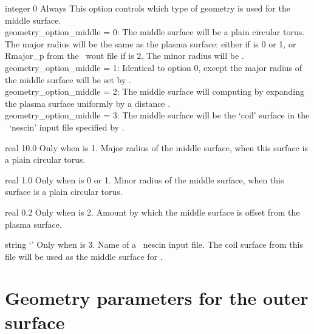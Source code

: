 {integer}
{0}
{Always}
{This option controls which type of geometry is used for the middle surface.\\

{\ttfamily geometry\_option\_middle} = 0: The middle surface will be a plain circular torus. The major radius will be the 
same as the plasma surface: either  if  is 0 or 1, or {\ttfamily Rmajor\_p} from the \vmec~{\ttfamily wout} file
if   is 2.
     The minor radius will be .\\

{\ttfamily geometry\_option\_middle} = 1: Identical to option 0, except the major radius of the middle surface will be set by .\\

{\ttfamily geometry\_option\_middle} = 2: The middle surface will computing by expanding the plasma surface uniformly by a distance .\\

{\ttfamily geometry\_option\_middle} = 3: The middle surface will be the `coil' surface in the \nescoil~`nescin' input file specified by .
}

\myhrule

{real}
{10.0}
{Only when  is 1.}
{Major radius of the middle surface, when this surface is a plain circular torus.}

\myhrule

{real}
{1.0}
{Only when  is 0 or 1.}
{Minor radius of the middle surface, when this surface is a plain circular torus.}


\myhrule

{real}
{0.2}
{Only when  is 2.}
{Amount by which the middle surface is offset from the plasma surface.}

\myhrule

{string}
{`'}
{Only when  is 3.}
{Name of a \nescoil~{\ttfamily nescin} input file. The coil surface from
this file will be used as the middle surface for \bdistrib.}


\section{Geometry parameters for the outer surface}


